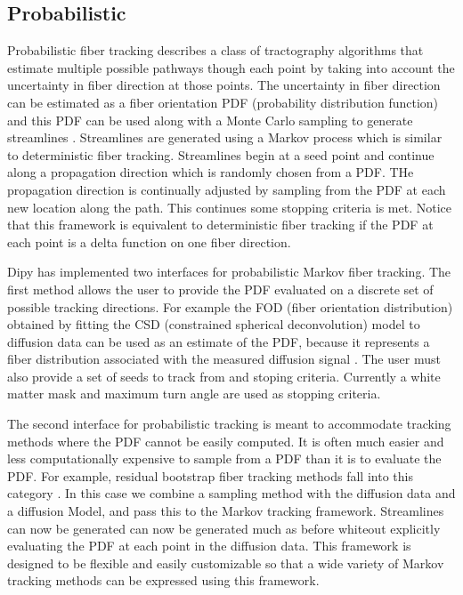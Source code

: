 \documentclass{bioinfo}
\begin{document}
\subsection{Probabilistic}

Probabilistic fiber tracking describes a class of tractography algorithms that
estimate multiple possible pathways though each point by taking into
account the uncertainty in fiber direction at those points. The uncertainty in
fiber direction can be estimated as a fiber orientation PDF (probability distribution
function) and this PDF can be used along with a Monte Carlo sampling to
generate streamlines \citep{morris2008probabilistic}. Streamlines are generated using a
Markov process which is similar to deterministic fiber tracking. Streamlines begin
at a seed point and continue along a propagation direction which is randomly
chosen from a PDF. THe propagation direction is continually adjusted by
sampling from the PDF at each new location along the path. This continues
some stopping criteria is met. Notice that this framework is equivalent to
deterministic fiber tracking if the PDF at each point is a delta function on
one fiber direction.

Dipy has implemented two interfaces for probabilistic Markov fiber tracking. The
first method allows the user to provide the PDF evaluated on a discrete set of
possible tracking directions. For example the FOD (fiber orientation distribution) 
obtained by fitting the CSD (constrained spherical deconvolution) model to diffusion
data can be used as an estimate of the PDF, because it represents a fiber distribution
associated with the measured diffusion signal \citep{jeurissen2011probabilistic}. The user must
also provide a set of seeds to track from and stoping criteria. Currently a white matter
mask and maximum turn angle are used as stopping criteria.

The second interface for probabilistic tracking is meant to accommodate	tracking
methods where the PDF cannot be easily computed. It is often much easier and less
computationally expensive to sample from a PDF than it is to evaluate the PDF. For
example, residual bootstrap fiber tracking methods fall into this category \citep{berman2008probabilistic}.
In this case we combine a sampling method with the diffusion data and a diffusion Model,
and pass this to the Markov tracking framework. Streamlines can now be generated
can now be generated much as before whiteout explicitly evaluating the PDF at each
point in the diffusion data. This framework is designed to be flexible and easily
customizable so that a wide variety of Markov tracking methods can be expressed
using this framework.
\end{document}
